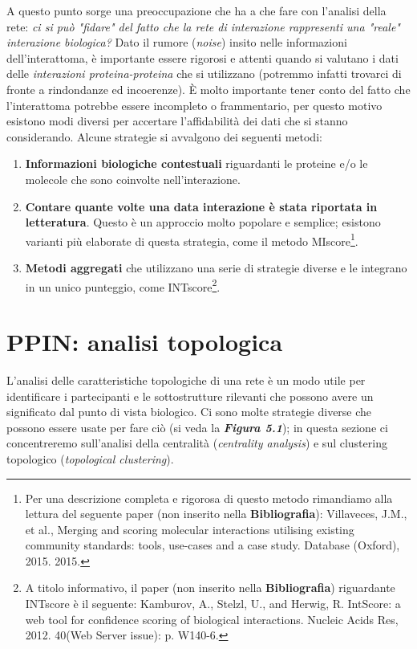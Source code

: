 \documentclass[11pt]{article}
\begin{document}
A questo punto sorge una preoccupazione che ha a che fare con l'analisi della rete: \textit{ci si può "fidare" del fatto che la rete di interazione rappresenti una "reale" interazione biologica?} Dato il rumore (\textit{noise}) insito nelle informazioni dell'interattoma, è importante essere rigorosi e attenti quando si valutano i dati delle \textit{interazioni proteina-proteina} che si utilizzano (potremmo infatti trovarci di fronte a rindondanze ed incoerenze). È molto importante tener conto del fatto che l'interattoma potrebbe essere incompleto o frammentario, per questo motivo esistono modi diversi per accertare l'affidabilità dei dati che si stanno considerando. Alcune strategie si avvalgono dei seguenti metodi:
\begin{enumerate}
\setlength{\itemsep}{1pt}
  \setlength{\parskip}{0pt}
  \setlength{\parsep}{0pt}
\item \textbf{Informazioni biologiche contestuali} riguardanti le proteine e/o le molecole che sono coinvolte nell'interazione.
\item \textbf{Contare quante volte una data interazione è stata riportata in letteratura}. Questo è un approccio molto popolare e semplice; esistono varianti più elaborate di questa strategia, come il metodo MIscore\footnote{Per una descrizione completa e rigorosa di questo metodo rimandiamo alla lettura del seguente paper (non inserito nella \textbf{Bibliografia}): Villaveces, J.M., et al., Merging and scoring molecular interactions utilising existing community standards: tools, use-cases and a case study. Database (Oxford), 2015. 2015. }.
\item \textbf{Metodi aggregati} che utilizzano una serie di strategie diverse e le integrano in un unico punteggio, come INTscore\footnote{A titolo informativo, il paper (non inserito nella \textbf{Bibliografia}) riguardante INTscore è il seguente: Kamburov, A., Stelzl, U., and Herwig, R. IntScore: a web tool for confidence scoring of biological interactions. Nucleic Acids Res, 2012. 40(Web Server issue): p. W140-6.}.
\end{enumerate}

\section{PPIN: analisi topologica}
L'analisi delle caratteristiche topologiche di una rete è un modo utile per identificare i partecipanti e le sottostrutture rilevanti che possono avere un significato dal punto di vista biologico. Ci sono molte strategie diverse che possono essere usate per fare ciò (si veda la \textit{\textbf{Figura 5.1}}); in questa sezione ci concentreremo sull'analisi della centralità (\textit{centrality analysis}) e sul clustering topologico (\textit{topological clustering}).
\end{document}
